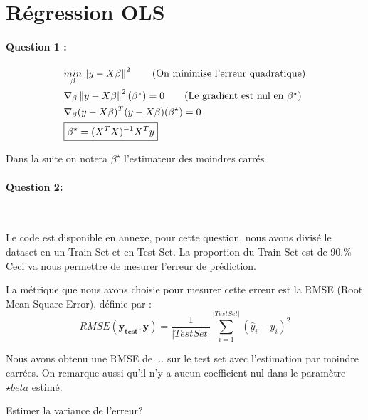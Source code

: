 \documentclass{article}
\newcommand{\norm}[1]{\left\lVert#1\right\rVert^{2}}
\begin{document}

\title{	}

\section{Régression OLS}

\paragraph{Question 1 :}

\begin{align}
&\underset{\beta}{min}\norm{ y - X \beta} \tag{On minimise l'erreur quadratique}
\\ &\nabla_{\beta} \norm{ y - X \beta}(\beta^{\star}) = 0 \tag{Le gradient est nul en $\beta^\star$}
\notag \\ &\nabla_{\beta} ( y - X \beta)^{T} ( y - X \beta) (\beta^{\star}) = 0
\notag \\ &\boxed{\beta^{\star} = (X^{T}X)^{-1}X^{T}y}
\end{align}


Dans la suite on notera $\beta^{\star}$ l'estimateur des moindres carrés.

\paragraph{Question 2:}
~\par

Le code est disponible en annexe, pour cette question, nous avons divisé le dataset en un Train Set et en Test Set. La proportion du Train Set est de 90.\%
Ceci va nous permettre de mesurer l'erreur de prédiction.

La métrique que nous avons choisie pour mesurer cette erreur est la RMSE (Root Mean Square Error), définie par :
\begin{equation}
RMSE(\textbf{y}_{\textbf{test}}, \hat{\textbf{y}})= \frac{1}{|Test Set|}\sum_{i=1}^{|Test Set|}{(\hat{y}_{i} - y_{i})^2}
\end{equation}

Nous avons obtenu une RMSE de ... sur le test set avec l'estimation par moindre carrées. On remarque aussi qu'il n'y a aucun coefficient nul dans le paramètre $\star{beta}$ estimé.

Estimer la variance de l'erreur?
\end{document}
